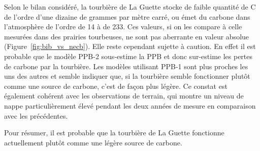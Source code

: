Selon le bilan considéré, la tourbière de La Guette stocke de faible quantité de C de l'ordre d'une dizaine de grammes par mètre carré, ou émet du carbone dans l'atmosphère de l'ordre de \num{14} à de \SI{233}{\gcma}.
Ces valeurs, si on les compare à celle mesurées dans des prairies tourbeuses, ne sont pas aberrante en valeur absolue (Figure~\ref{fig:bib_vs_necb}).
Elle reste cependant sujette à caution.
En effet il est probable que le modèle PPB-2 sous-estime la PPB et donc sur-estime les pertes de carbone par la tourbière.
Les modèles utilisant PPB-1 sont plus proches les uns des autres et semble indiquer que, si la tourbière semble fonctionner plutôt comme une source de carbone, c'est de façon plus légère.
Ce constat est également cohérent avec les observations de terrain, qui montre un niveau de nappe particulièrement élevé pendant les deux années de mesure en comparaison avec les précédentes.

Pour résumer, il est probable que la tourbière de La Guette fonctionne actuellement plutôt comme une légère source de carbone.









